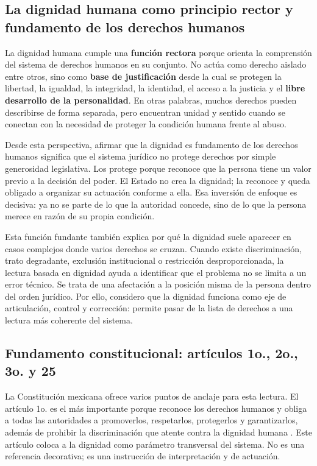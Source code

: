\documentclass[
	spanish,
	letterpaper, oneside
]{article}
\begin{document}
\subsection{La dignidad humana como principio rector y fundamento de los derechos humanos}

La dignidad humana cumple una \textbf{función rectora} porque orienta la comprensión del sistema de derechos humanos en su conjunto. No actúa como derecho aislado entre otros, sino como \textbf{base de justificación} desde la cual se protegen la libertad, la igualdad, la integridad, la identidad, el acceso a la justicia y el \textbf{libre desarrollo de la personalidad}. En otras palabras, muchos derechos pueden describirse de forma separada, pero encuentran unidad y sentido cuando se conectan con la necesidad de proteger la condición humana frente al abuso.

Desde esta perspectiva, afirmar que la dignidad es fundamento de los derechos humanos significa que el sistema jurídico no protege derechos por simple generosidad legislativa. Los protege porque reconoce que la persona tiene un valor previo a la decisión del poder. El Estado no crea la dignidad; la reconoce y queda obligado a organizar su actuación conforme a ella. Esa inversión de enfoque es decisiva: ya no se parte de lo que la autoridad concede, sino de lo que la persona merece en razón de su propia condición.

Esta función fundante también explica por qué la dignidad suele aparecer en casos complejos donde varios derechos se cruzan. Cuando existe discriminación, trato degradante, exclusión institucional o restricción desproporcionada, la lectura basada en dignidad ayuda a identificar que el problema no se limita a un error técnico. Se trata de una afectación a la posición misma de la persona dentro del orden jurídico. Por ello, considero que la dignidad funciona como eje de articulación, control y corrección: permite pasar de la lista de derechos a una lectura más coherente del sistema.
\subsection{Fundamento constitucional: artículos 1o., 2o., 3o. y 25}

La Constitución mexicana ofrece varios puntos de anclaje para esta lectura. El artículo 1o. es el más importante porque reconoce los derechos humanos y obliga a todas las autoridades a promoverlos, respetarlos, protegerlos y garantizarlos, además de prohibir la discriminación que atente contra la dignidad humana \citep{constitucionCPEUM2026}. Este artículo coloca a la dignidad como parámetro transversal del sistema. No es una referencia decorativa; es una instrucción de interpretación y de actuación.
\end{document}
